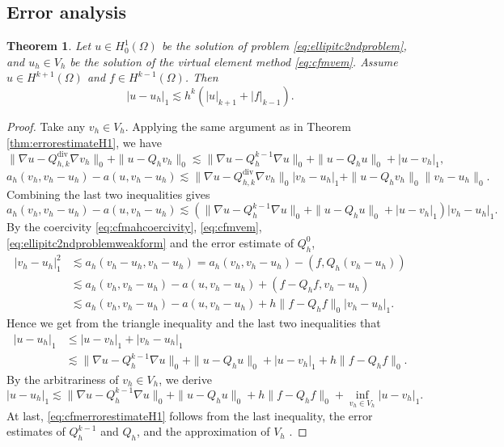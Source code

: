 \documentclass[10pt]{amsart}
\newtheorem{theorem}{Theorem}[section]
\renewcommand{\div}{\operatorname{div}}
\numberwithin{equation}{section}
\begin{document}
\subsection{Error analysis}
\begin{theorem}\label{thm:cfmerrorestimateH1}
Let $u\in H_0^1(\Omega)$ be the solution of problem \eqref{eq:ellipitc2ndproblem}, and $u_h\in V_h$ be the solution of the virtual element method \eqref{eq:cfmvem}. Assume $u\in H^{k+1}(\Omega)$ and $f\in H^{k-1}(\Omega)$. Then
\begin{equation}\label{eq:cfmerrorestimateH1}
|u-u_h|_1\lesssim h^k(|u|_{k+1}+|f|_{k-1}).
\end{equation}
\end{theorem}
\begin{proof}
Take any $v_h\in V_h$. 
Applying the same argument as in Theorem \ref{thm:errorestimateH1}, we have
\[
\|\nabla u-Q_{h,k}^{\div}\nabla v_h\|_0+\|u-Q_hv_h\|_0\lesssim \|\nabla u-Q_h^{k-1}\nabla u\|_0+\|u-Q_hu\|_0+|u-v_h|_1,
\]
\[
a_h(v_h, v_h-u_h)-a(u,v_h-u_h)\lesssim \|\nabla u-Q_{h,k}^{\div}\nabla v_h\|_0|v_h-u_h|_1+\|u-Q_hv_h\|_0\|v_h-u_h\|_0.
\]
Combining the last two inequalities gives
\[
a_h(v_h, v_h-u_h)-a(u,v_h-u_h)\lesssim(\|\nabla u-Q_h^{k-1}\nabla u\|_0+\|u-Q_hu\|_0+|u-v_h|_1)|v_h-u_h|_1.
\]
By the coercivity \eqref{eq:cfmahcoercivity}, \eqref{eq:cfmvem}, \eqref{eq:ellipitc2ndproblemweakform} and the error estimate of $Q_h^0$,
\begin{align*}
|v_h-u_h|_1^2&\lesssim a_h(v_h-u_h, v_h-u_h)=a_h(v_h, v_h-u_h)-(f, Q_h(v_h-u_h)) \\
&\lesssim a_h(v_h, v_h-u_h)-a(u,v_h-u_h)+(f-Q_hf, v_h-u_h) \\
&\lesssim a_h(v_h, v_h-u_h)-a(u,v_h-u_h)+h\|f-Q_hf\|_0|v_h-u_h|_1.
\end{align*}
Hence we get from the triangle inequality and the last two inequalities that
\begin{align*}  
|u-u_h|_1&\leq|u-v_h|_1+|v_h-u_h|_1 \\
&\lesssim \|\nabla u-Q_h^{k-1}\nabla u\|_0+\|u-Q_hu\|_0+|u-v_h|_1+h\|f-Q_hf\|_0.
\end{align*}
By the arbitrariness of $v_h\in V_h$, we derive
\[
|u-u_h|_1\lesssim \|\nabla u-Q_h^{k-1}\nabla u\|_0+\|u-Q_hu\|_0+h\|f-Q_hf\|_0+\inf_{v_h\in V_h}|u-v_h|_1.
\]
At last, \eqref{eq:cfmerrorestimateH1} follows from the last inequality, the error estimates of $Q_h^{k-1}$ and $Q_h$, and the approximation of $V_h$ \cite{Huang2021,ChenHuang2018,BrennerSung2018,BeiraodaVeigaLovadinaRusso2017}.
\end{proof}
\end{document}
